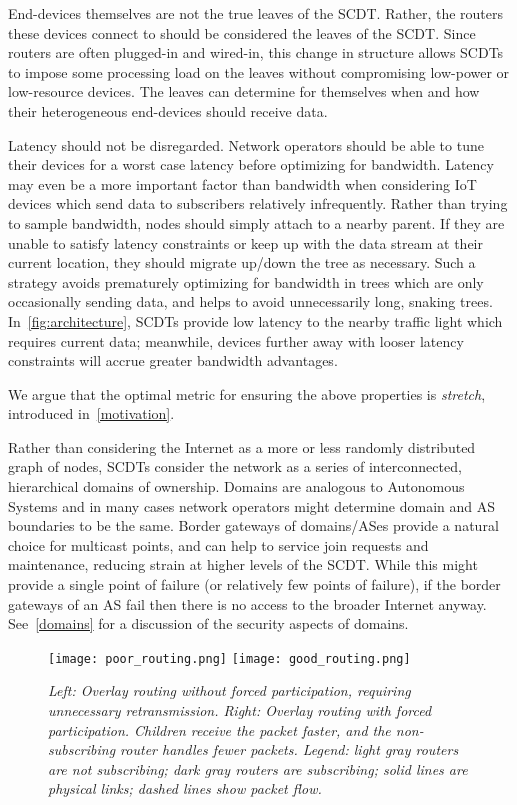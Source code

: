 End-devices themselves are not the true leaves of the SCDT.  Rather, the routers
these devices connect to should be considered the leaves of the SCDT.  Since
routers are often plugged-in and wired-in, this change in structure allows SCDTs
to impose some processing load on the leaves without compromising low-power or
low-resource devices.  The leaves can determine for themselves when and how
their heterogeneous end-devices should receive data.

Latency should not be disregarded.  Network operators should be able to tune
their devices for a worst case latency before
optimizing for bandwidth.  Latency may even be a more important factor than
bandwidth when considering IoT devices which send data to subscribers relatively
infrequently.  Rather than trying to sample bandwidth, nodes should simply
attach to a nearby parent.  If they are unable to satisfy latency constraints or
keep up with the data stream at their current location, they should migrate
up/down the tree as necessary.  Such a strategy avoids prematurely optimizing
for bandwidth in trees which are only occasionally sending data, and helps to
avoid unnecessarily long, snaking trees.  In~\autoref{fig:architecture}, SCDTs 
provide low latency
to the nearby traffic light which requires current data; meanwhile, devices
further away with looser latency constraints will accrue greater bandwidth
advantages. 

We argue that the optimal metric for ensuring the above properties is \textit{stretch}, introduced in~\autoref{motivation}. 

Rather than considering the Internet as a more or less randomly
distributed graph of nodes, SCDTs consider the network as a series of
interconnected, hierarchical domains of ownership.  Domains are analogous to
Autonomous Systems \cite{RFC1930} and in many cases network operators might
determine domain and AS boundaries to be the same.  Border gateways of
domains/ASes provide a natural choice for multicast points, and can help to
service join requests and maintenance, reducing strain at higher levels of the
SCDT.  While this might provide a single point of failure (or relatively few
points of failure), if the border gateways of an AS fail then there is no access to the
broader Internet anyway.  See~\autoref{domains} for a discussion of the security aspects of domains.

\begin{figure}[t]
	\begin{center}
		\texttt{[image: poor\_routing.png]}
		\texttt{[image: good\_routing.png]}
	\end{center}
	\vspace{-1.3em}
	\caption{\small \itshape Left: Overlay routing without forced participation, requiring unnecessary retransmission.  Right: Overlay routing with forced participation.  Children receive the packet faster, and the non-subscribing router handles fewer packets.  Legend: light gray routers are not subscribing; dark gray routers are subscribing; solid lines are physical links; dashed lines show packet flow.}
	\vspace{-1em}
	\label{fig:overlay-tree}
\end{figure}

